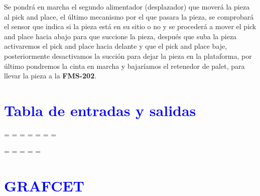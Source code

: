 Se pondrá en marcha el segundo alimentador (desplazador) que moverá la pieza al pick and place, el último mecanismo por el que pasara la pieza, se comprobará el sensor que indica si la pieza está en su sitio o no y se procederá a mover el pick and place hacia abajo para que succione la pieza, después que suba la pieza  activaremos el pick and place hacia delante y que el pick and place baje, posteriormente desactivamos la succión para dejar la pieza en la plataforma, por último pondremos la cinta en marcha y bajaríamos el retenedor de palet, para llevar la pieza a la \textbf{FMS-202}.
\section{\textcolor{blue}{Tabla de entradas y salidas}}

\newpage
    \paperwidth=\pdfpageheight
    \paperheight=\pdfpagewidth
    \pdfpageheight=\paperheight
    \pdfpagewidth=\paperwidth
    \headwidth=\textheight
    \begingroup 
        \vsize=\textwidth
        \hsize=\textheight
            
    \endgroup
\newpage
\paperwidth=\pdfpageheight
    \paperheight=\pdfpagewidth
    \pdfpageheight=\paperheight
    \pdfpagewidth=\paperwidth
    \headwidth=\textwidth
\section{\textcolor{blue}{GRAFCET}} 


    
   
